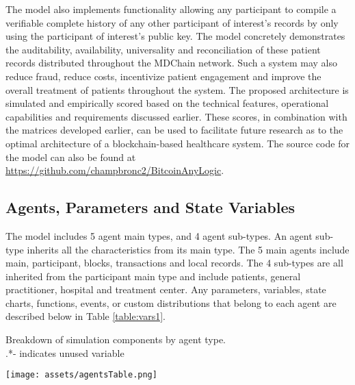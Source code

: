 \documentclass[12pt]{report}
\begin{document}
The model also implements functionality allowing any participant to compile a verifiable complete history of any other participant of interest's records by only using the participant of interest's public key. The model concretely demonstrates the auditability, availability, universality and reconciliation of these patient records distributed throughout the MDChain network. Such a system may also reduce fraud, reduce costs, incentivize patient engagement and improve the overall treatment of patients throughout the system. The proposed architecture is simulated and empirically scored based on the technical features, operational capabilities and requirements discussed earlier. These scores, in combination with the matrices developed earlier, can be used to facilitate future research as to the optimal architecture of a blockchain-based healthcare system. The source code for the model can also be found at \url{https://github.com/champbronc2/BitcoinAnyLogic}.



\subsection{Agents, Parameters and State Variables}
The model includes 5 agent main types, and 4 agent sub-types. An agent sub-type inherits all the characteristics from its main type. The 5 main agents include main, participant, blocks, transactions and local records. The 4 sub-types are all inherited from the participant main type and include patients, general practitioner, hospital and treatment center. Any parameters, variables, state charts, functions, events, or custom distributions that belong to each agent are described below in Table \ref{table:vars1}.

\begin{table}[h]
\begin{center}
\caption{Breakdown of simulation components by agent type.\\ .*- indicates unused variable}
\texttt{[image: assets/agentsTable.png]}
\label{table:vars1}
\end{center}
\end{table}
\end{document}
